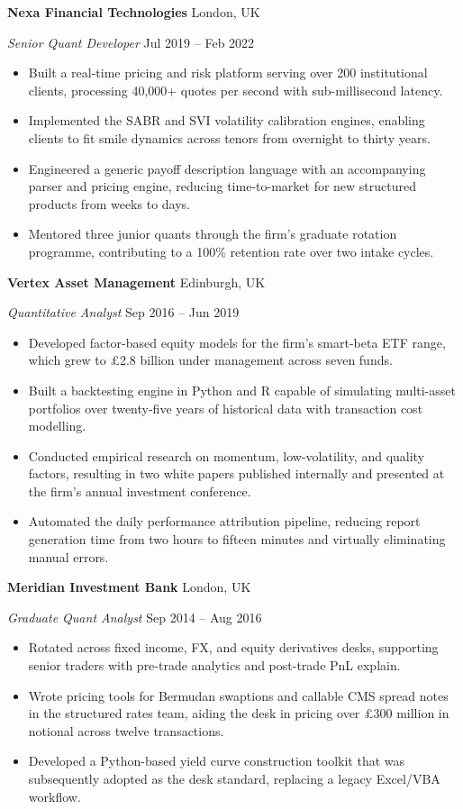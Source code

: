 \documentclass[11pt,a4paper]{article}
\newcommand{\roleentry}[4]{%
  \noindent%
  {\bfseries #1} \hfill {\color{accent}\footnotesize #2}\par
  \noindent%
  {\itshape #3} \hfill {\color{accent}\footnotesize #4}\par
  \vspace{0.3ex}%
}
\begin{document}
\roleentry{Nexa Financial Technologies}{London, UK}{Senior Quant Developer}{Jul 2019 -- Feb 2022}
\begin{itemize}
  \item Built a real-time pricing and risk platform serving over 200 institutional clients, processing 40,000+ quotes per second with sub-millisecond latency.
  \item Implemented the SABR and SVI volatility calibration engines, enabling clients to fit smile dynamics across tenors from overnight to thirty years.
  \item Engineered a generic payoff description language with an accompanying parser and pricing engine, reducing time-to-market for new structured products from weeks to days.
  \item Mentored three junior quants through the firm's graduate rotation programme, contributing to a 100\% retention rate over two intake cycles.
\end{itemize}

\roleentry{Vertex Asset Management}{Edinburgh, UK}{Quantitative Analyst}{Sep 2016 -- Jun 2019}
\begin{itemize}
  \item Developed factor-based equity models for the firm's smart-beta ETF range, which grew to \pounds 2.8 billion under management across seven funds.
  \item Built a backtesting engine in Python and R capable of simulating multi-asset portfolios over twenty-five years of historical data with transaction cost modelling.
  \item Conducted empirical research on momentum, low-volatility, and quality factors, resulting in two white papers published internally and presented at the firm's annual investment conference.
  \item Automated the daily performance attribution pipeline, reducing report generation time from two hours to fifteen minutes and virtually eliminating manual errors.
\end{itemize}

\roleentry{Meridian Investment Bank}{London, UK}{Graduate Quant Analyst}{Sep 2014 -- Aug 2016}
\begin{itemize}
  \item Rotated across fixed income, FX, and equity derivatives desks, supporting senior traders with pre-trade analytics and post-trade PnL explain.
  \item Wrote pricing tools for Bermudan swaptions and callable CMS spread notes in the structured rates team, aiding the desk in pricing over \pounds 300 million in notional across twelve transactions.
  \item Developed a Python-based yield curve construction toolkit that was subsequently adopted as the desk standard, replacing a legacy Excel/VBA workflow.
\end{itemize}
\end{document}
